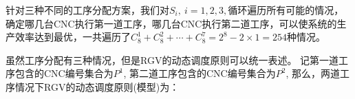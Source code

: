 \documentclass[no-math,withoutpreface,bwprint]{cumcmthesis} %
\numberwithin{equation}{section}
\numberwithin{figure}{section}
\numberwithin{table}{section}
\begin{document}
针对三种不同的工序分配方案，我们对$S_i,\ i=1,2,3,$循环遍历所有可能的情况，确定哪几台CNC执行第一道工序，哪几台CNC执行第二道工序，可以使系统的生产效率达到最优，一共遍历了$C_8^1+C_8^2+\cdots+C_8^7=2^8-2\times1=254$种情况。

虽然工序分配有三种情况，但是RGV的动态调度原则可以统一表述。
记第一道工序包含的CNC编号集合为$P^1$,
第二道工序包含的CNC编号集合为$P^2$,
那么，两道工序情况下RGV的动态调度原则(模型)为：
\end{document}
